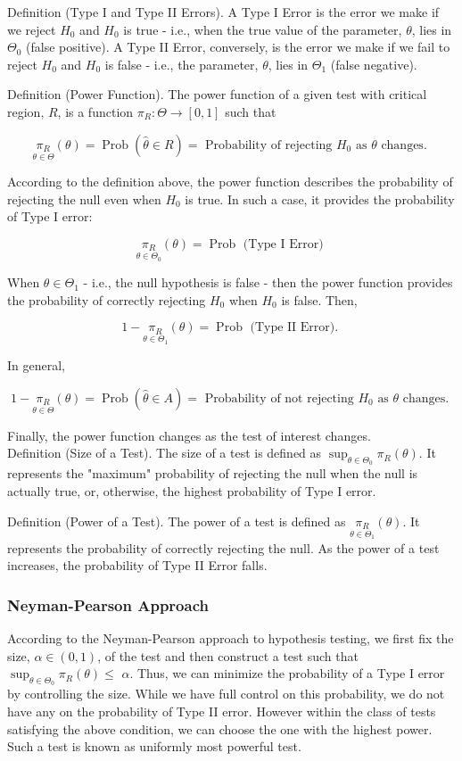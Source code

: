 Definition (Type I and Type II Errors). A Type I Error is the error we make if we reject $H_{0}$ and $H_{0}$ is true - i.e., when the true value of the parameter, $\theta$, lies in $\Theta_{0}$ (false positive). A Type II Error, conversely, is the error we make if we fail to reject $H_{0}$ and $H_{0}$ is false - i.e., the parameter, $\theta$, lies in $\Theta_{1}$ (false negative).

Definition (Power Function). The power function of a given test with critical region, $R$, is a function $\pi_{R}: \Theta \longrightarrow[0,1]$ such that

$$
\underset{\theta \in \Theta}{\pi_{R}}(\theta)=\operatorname{Prob}(\widehat{\theta} \in R)=\text { Probability of rejecting } H_{0} \text { as } \theta \text { changes. }
$$

According to the definition above, the power function describes the probability of rejecting the null even when $H_{0}$ is true. In such a case, it provides the probability of Type I error:

$$
\underset{\theta \in \Theta_{0}}{\pi_{R}}(\theta)=\operatorname{Prob} \text { (Type I Error) }
$$

When $\theta \in \Theta_{1}$ - i.e., the null hypothesis is false - then the power function provides the probability of correctly rejecting $H_{0}$ when $H_{0}$ is false. Then,

$$
1-\underset{\theta \in \Theta_{1}}{\pi_{R}}(\theta)=\operatorname{Prob} \text { (Type II Error). }
$$

In general,

$$
1-\underset{\theta \in \Theta}{\pi_{R}}(\theta)=\operatorname{Prob}(\widehat{\theta} \in A)=\text { Probability of not rejecting } H_{0} \text { as } \theta \text { changes. }
$$

Finally, the power function changes as the test of interest changes.\\
Definition (Size of a Test). The size of a test is defined as $\sup _{\theta \in \Theta_{0}} \pi_{R}(\theta)$. It represents the "maximum" probability of rejecting the null when the null is actually true, or, otherwise, the highest probability of Type I error.

Definition (Power of a Test). The power of a test is defined as $\underset{\theta \in \Theta_{1}}{\pi_{R}}(\theta)$. It represents the probability of correctly rejecting the null. As the power of a test increases, the probability of Type II Error falls.

\subsubsection{Neyman-Pearson Approach}
According to the Neyman-Pearson approach to hypothesis testing, we first fix the size, $\alpha \in(0,1)$, of the test and then construct a test such that $\sup _{\theta \in \Theta_{0}} \pi_{R}(\theta) \leq$ $\alpha$. Thus, we can minimize the probability of a Type I error by controlling the size. While we have full control on this probability, we do not have any on the probability of Type II error. However within the class of tests satisfying the above condition, we can choose the one with the highest power. Such a test is known as uniformly most powerful test.

